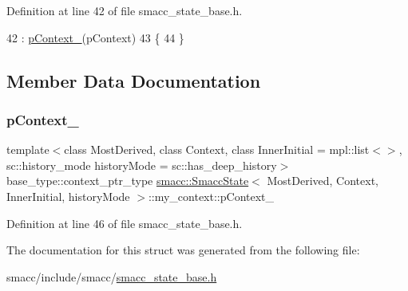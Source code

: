 Definition at line 42 of file smacc\+\_\+state\+\_\+base.\+h.


\begin{DoxyCode}
42                                                               : \hyperlink{structsmacc_1_1SmaccState_1_1my__context_a85f6eff5aba687932efe3f8117be76d3}{pContext\_}(pContext)
43       \{
44       \}
\end{DoxyCode}


\subsection{Member Data Documentation}
\mbox{\label{structsmacc_1_1SmaccState_1_1my__context_a85f6eff5aba687932efe3f8117be76d3}} 
\subsubsection{\texorpdfstring{p\+Context\+\_\+}{pContext\_}}
{\footnotesize\ttfamily template$<$class Most\+Derived, class Context, class Inner\+Initial = mpl\+::list$<$$>$, sc\+::history\+\_\+mode history\+Mode = sc\+::has\+\_\+deep\+\_\+history$>$ \\
base\+\_\+type\+::context\+\_\+ptr\+\_\+type \hyperlink{classsmacc_1_1SmaccState}{smacc\+::\+Smacc\+State}$<$ Most\+Derived, Context, Inner\+Initial, history\+Mode $>$\+::my\+\_\+context\+::p\+Context\+\_\+}



Definition at line 46 of file smacc\+\_\+state\+\_\+base.\+h.



The documentation for this struct was generated from the following file\+:\begin{DoxyCompactItemize}
\item 
smacc/include/smacc/\hyperlink{smacc__state__base_8h}{smacc\+\_\+state\+\_\+base.\+h}\end{DoxyCompactItemize}
